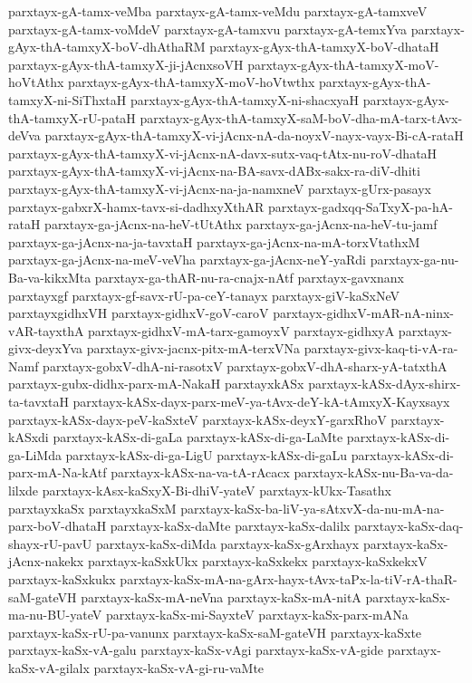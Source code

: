 {parxtayx-gA-tamx-veMba
parxtayx-gA-tamx-veMdu
parxtayx-gA-tamxveV
parxtayx-gA-tamx-voMdeV
parxtayx-gA-tamxvu
parxtayx-gA-temxYva
parxtayx-gAyx-thA-tamxyX-boV-dhAthaRM
parxtayx-gAyx-thA-tamxyX-boV-dhataH
parxtayx-gAyx-thA-tamxyX-ji-jAcnxsoVH
parxtayx-gAyx-thA-tamxyX-moV-hoVtAthx
parxtayx-gAyx-thA-tamxyX-moV-hoVtwthx
parxtayx-gAyx-thA-tamxyX-ni-SiThxtaH
parxtayx-gAyx-thA-tamxyX-ni-shacxyaH
parxtayx-gAyx-thA-tamxyX-rU-pataH
parxtayx-gAyx-thA-tamxyX-saM-boV-dha-mA-tarx-tAvx-deVva
parxtayx-gAyx-thA-tamxyX-vi-jAcnx-nA-da-noyxV-nayx-vayx-Bi-cA-rataH
parxtayx-gAyx-thA-tamxyX-vi-jAcnx-nA-davx-sutx-vaq-tAtx-nu-roV-dhataH
parxtayx-gAyx-thA-tamxyX-vi-jAcnx-na-BA-savx-dABx-sakx-ra-diV-dhiti
parxtayx-gAyx-thA-tamxyX-vi-jAcnx-na-ja-namxneV
parxtayx-gUrx-pasayx
parxtayx-gabxrX-hamx-tavx-si-dadhxyXthAR
parxtayx-gadxqq-SaTxyX-pa-hA-rataH
parxtayx-ga-jAcnx-na-heV-tUtAthx
parxtayx-ga-jAcnx-na-heV-tu-jamf
parxtayx-ga-jAcnx-na-ja-tavxtaH
parxtayx-ga-jAcnx-na-mA-torxVtathxM
parxtayx-ga-jAcnx-na-meV-veVha
parxtayx-ga-jAcnx-neY-yaRdi
parxtayx-ga-nu-Ba-va-kikxMta
parxtayx-ga-thAR-nu-ra-cnajx-nAtf
parxtayx-gavxnanx
parxtayxgf
parxtayx-gf-savx-rU-pa-ceY-tanayx
parxtayx-giV-kaSxNeV
parxtayxgidhxVH
parxtayx-gidhxV-goV-caroV
parxtayx-gidhxV-mAR-nA-ninx-vAR-tayxthA
parxtayx-gidhxV-mA-tarx-gamoyxV
parxtayx-gidhxyA
parxtayx-givx-deyxYva
parxtayx-givx-jacnx-pitx-mA-terxVNa
parxtayx-givx-kaq-ti-vA-ra-Namf
parxtayx-gobxV-dhA-ni-rasotxV
parxtayx-gobxV-dhA-sharx-yA-tatxthA
parxtayx-gubx-didhx-parx-mA-NakaH
parxtayxkASx
parxtayx-kASx-dAyx-shirx-ta-tavxtaH
parxtayx-kASx-dayx-parx-meV-ya-tAvx-deY-kA-tAmxyX-Kayxsayx
parxtayx-kASx-dayx-peV-kaSxteV
parxtayx-kASx-deyxY-garxRhoV
parxtayx-kASxdi
parxtayx-kASx-di-gaLa
parxtayx-kASx-di-ga-LaMte
parxtayx-kASx-di-ga-LiMda
parxtayx-kASx-di-ga-LigU
parxtayx-kASx-di-gaLu
parxtayx-kASx-di-parx-mA-Na-kAtf
parxtayx-kASx-na-va-tA-rAcacx
parxtayx-kASx-nu-Ba-va-da-lilxde
parxtayx-kAsx-kaSxyX-Bi-dhiV-yateV
parxtayx-kUkx-Tasathx
parxtayxkaSx
parxtayxkaSxM
parxtayx-kaSx-ba-liV-ya-sAtxvX-da-nu-mA-na-parx-boV-dhataH
parxtayx-kaSx-daMte
parxtayx-kaSx-dalilx
parxtayx-kaSx-daq-shayx-rU-pavU
parxtayx-kaSx-diMda
parxtayx-kaSx-gArxhayx
parxtayx-kaSx-jAcnx-nakekx
parxtayx-kaSxkUkx
parxtayx-kaSxkekx
parxtayx-kaSxkekxV
parxtayx-kaSxkukx
parxtayx-kaSx-mA-na-gArx-hayx-tAvx-taPx-la-tiV-rA-thaR-saM-gateVH
parxtayx-kaSx-mA-neVna
parxtayx-kaSx-mA-nitA
parxtayx-kaSx-ma-nu-BU-yateV
parxtayx-kaSx-mi-SayxteV
parxtayx-kaSx-parx-mANa
parxtayx-kaSx-rU-pa-vanunx
parxtayx-kaSx-saM-gateVH
parxtayx-kaSxte
parxtayx-kaSx-vA-galu
parxtayx-kaSx-vAgi
parxtayx-kaSx-vA-gide
parxtayx-kaSx-vA-gilalx
parxtayx-kaSx-vA-gi-ru-vaMte
}
